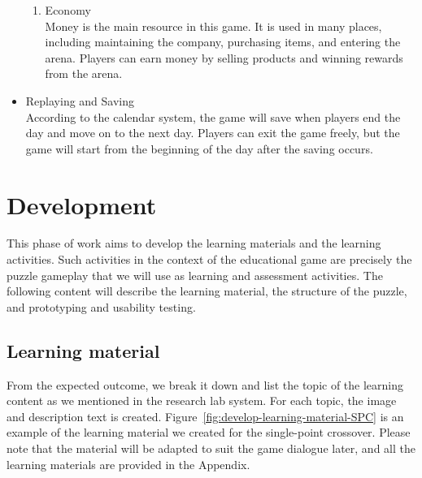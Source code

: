 \documentclass[12pt,oneside,openright,a4paper]{cpe-english-project}
\begin{document}
\begin{itemize}
\begin{enumerate}
	\item Economy \\
	Money is the main resource in this game. It is used in many places, including maintaining the company, purchasing items, and entering the arena. Players can earn money by selling products and winning rewards from the arena.
\end{enumerate}

\item Replaying and Saving \\
According to the calendar system, the game will save when players end the day and move on to the next day. Players can exit the game freely, but the game will start from the beginning of the day after the saving occurs.
\end{itemize}


\section{Development}
This phase of work aims to develop the learning materials and the learning activities. Such activities in the context of the educational game are precisely the puzzle gameplay that we will use as learning and assessment activities. The following content will describe the learning material, the structure of the puzzle, and prototyping and usability testing.

\subsection{Learning material}
From the expected outcome, we break it down and list the topic of the learning content as we mentioned in the research lab system. For each topic, the image and description text is created. Figure~\ref{fig:develop-learning-material-SPC} is an example of the learning material we created for the single-point crossover. Please note that the material will be adapted to suit the game dialogue later, and all the learning materials are provided in the Appendix. %
\end{document}
